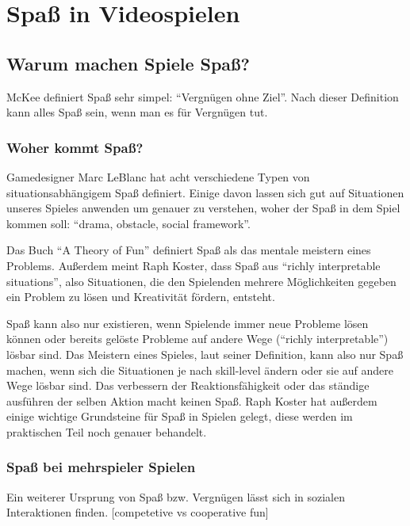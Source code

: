\chapter{Spaß in Videospielen}

\section{Warum machen Spiele Spaß?}

McKee definiert Spaß sehr simpel: "`Vergnügen ohne Ziel"'. Nach dieser Definition kann alles Spaß sein, wenn man es für Vergnügen tut.

\subsection{Woher kommt Spaß?}

Gamedesigner Marc LeBlanc hat acht verschiedene Typen von situationsabhängigem Spaß definiert. Einige davon lassen sich gut auf Situationen unseres Spieles anwenden um genauer zu verstehen, woher der Spaß in dem Spiel kommen soll: "`drama, obstacle, social framework"'. 

Das Buch "`A Theory of Fun"'\cite{_theory_of_fun} definiert Spaß als das mentale meistern eines Problems\cite[S. 71]{_theory_of_fun}. Außerdem meint Raph Koster, dass Spaß aus "`richly interpretable situations"'\cite[S. 40]{_theory_of_fun}, also Situationen, die den Spielenden mehrere Möglichkeiten gegeben ein Problem zu lösen und Kreativität fördern, entsteht. 

Spaß kann also nur existieren, wenn Spielende immer neue Probleme lösen können oder bereits gelöste Probleme auf andere Wege ("`richly interpretable"') lösbar sind. Das Meistern eines Spieles, laut seiner Definition, kann also nur Spaß machen, wenn sich die Situationen je nach skill-level ändern oder sie auf andere Wege lösbar sind. Das verbessern der Reaktionsfähigkeit oder das ständige ausführen der selben Aktion macht keinen Spaß. Raph Koster hat außerdem einige wichtige Grundsteine für Spaß in Spielen gelegt, diese werden im praktischen Teil noch genauer behandelt.

\subsection{Spaß bei mehrspieler Spielen}

Ein weiterer Ursprung von Spaß bzw. Vergnügen lässt sich in sozialen Interaktionen finden\cite[S. 72]{_theory_of_fun}.
[competetive vs cooperative fun]

